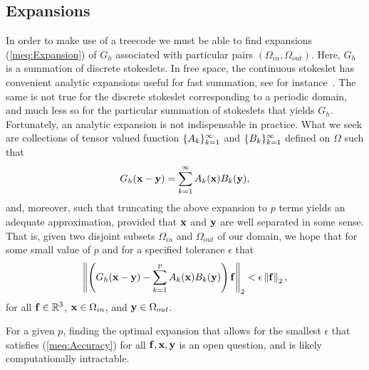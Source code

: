\subsection{Expansions}
\label{Sec:Treecode_Expansions}
In order to make use of a treecode we must be able to find expansions (\ref{meq:Expansion}) of $G_h$ associated with particular pairs $\left(\Omega_{in},\Omega_{out}\right)$. Here, 
$G_h$ is a summation of discrete stokeslets. In free space, the continuous stokeslet has convenient analytic expansions useful for fast summation, see for instance~\cite{Stokes_FMM}. The same is not true for the discrete stokeslet corresponding to a periodic domain, and much less so for the particular summation of stokeslets that yields $G_h$. Fortunately, an analytic expansion is not indispensable in practice. What we seek are collections of tensor valued function $\{A_k\}_{k=1}^\infty$ and $\{B_k\}_{k=1}^\infty$ defined on $\Omega$ such that 
\begin{equation}
G_h(\mathbf{x} - \mathbf{y}) = \sum_{k = 1}^\infty A_k(\mathbf{x}) B_k(\mathbf{y}),
\end{equation}
and, moreover, such that truncating the above expansion to $p$ terms yields an adequate approximation, provided that $\mathbf{x}$ and $\mathbf{y}$ are well separated in some sense. That is, given two disjoint subsets $\Omega_{in}$ and $\Omega_{out}$ of our domain, we hope that for some small value of $p$ and for a specified tolerance $\epsilon$ that
\begin{equation}
\left\lVert
\left(G_h(\mathbf{x} - \mathbf{y}) - \sum_{k = 1}^p A_k(\mathbf{x}) B_k(\mathbf{y})\right)
\mathbf{f}
\right\rVert_2 < \epsilon \left\lVert\mathbf{f}\right\rVert_2,
\label{meq:Accuracy}
\end{equation}
for all $\mathbf{f}\in\mathbb{R}^3$, $\mathbf{x}\in\Omega_{in}$, and $\mathbf{y}\in\Omega_{out}$.

For a given $p$, finding the optimal expansion that allows for the smallest $\epsilon$ that satisfies (\ref{meq:Accuracy}) for all $\mathbf{f},\mathbf{x},\mathbf{y}$ is an open question, and is likely computationally intractable.

